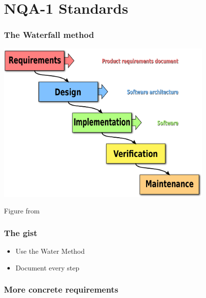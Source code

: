 \documentclass[12pt]{beamer}
\begin{document}
\section{NQA-1 Standards}

\begin{frame}[fragile]
\frametitle{The Waterfall method}
\centerline{\includegraphics[width=0.8\textwidth]{figures/waterfall.pdf}}
Figure from \cite{waterfall_wiki}
\end{frame}


\begin{frame}
\frametitle{The gist}

\begin{itemize}
\item{Use the Water Method}
\item{Document every step}
\end{itemize}

\end{frame}

\begin{frame}
\frametitle{More concrete requirements}


\end{frame}



\end{document}

